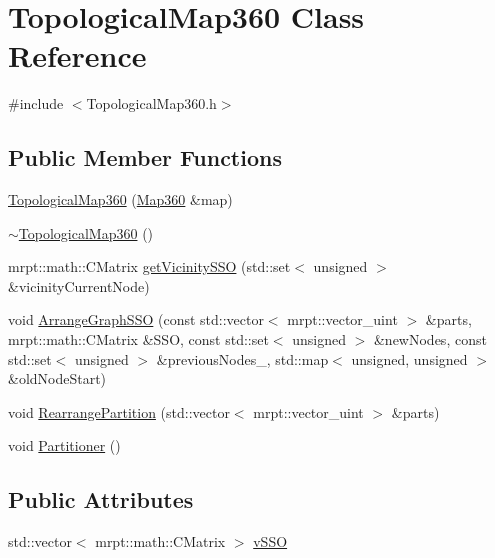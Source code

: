 \hypertarget{classTopologicalMap360}{\section{Topological\-Map360 Class Reference}
\label{classTopologicalMap360}
}


{\ttfamily \#include $<$Topological\-Map360.\-h$>$}

\subsection*{Public Member Functions}
\begin{DoxyCompactItemize}
\item 
\hyperlink{classTopologicalMap360_aa9495123b318c74b799e07696c64fff3}{Topological\-Map360} (\hyperlink{structMap360}{Map360} \&map)
\item 
\hyperlink{classTopologicalMap360_ac93dea0ba65018ccaec88dc867b53ee9}{$\sim$\-Topological\-Map360} ()
\item 
mrpt\-::math\-::\-C\-Matrix \hyperlink{classTopologicalMap360_ac8b1dfee4fe397ae1a0fc763ce70db7d}{get\-Vicinity\-S\-S\-O} (std\-::set$<$ unsigned $>$ \&vicinity\-Current\-Node)
\item 
void \hyperlink{classTopologicalMap360_a198788c478c2b0507863e40fb0a846b7}{Arrange\-Graph\-S\-S\-O} (const std\-::vector$<$ mrpt\-::vector\-\_\-uint $>$ \&parts, mrpt\-::math\-::\-C\-Matrix \&S\-S\-O, const std\-::set$<$ unsigned $>$ \&new\-Nodes, const std\-::set$<$ unsigned $>$ \&previous\-Nodes\-\_\-, std\-::map$<$ unsigned, unsigned $>$ \&old\-Node\-Start)
\item 
void \hyperlink{classTopologicalMap360_a66c900f0a2d4fa6e54b1bb3258e81355}{Rearrange\-Partition} (std\-::vector$<$ mrpt\-::vector\-\_\-uint $>$ \&parts)
\item 
void \hyperlink{classTopologicalMap360_a48b8efbf9cb860717b0e8bcb085246f6}{Partitioner} ()
\end{DoxyCompactItemize}
\subsection*{Public Attributes}
\begin{DoxyCompactItemize}
\item 
std\-::vector$<$ mrpt\-::math\-::\-C\-Matrix $>$ \hyperlink{classTopologicalMap360_a2cd7b8d445762886bdc2b902cbc6d818}{v\-S\-S\-O}
\end{DoxyCompactItemize}
